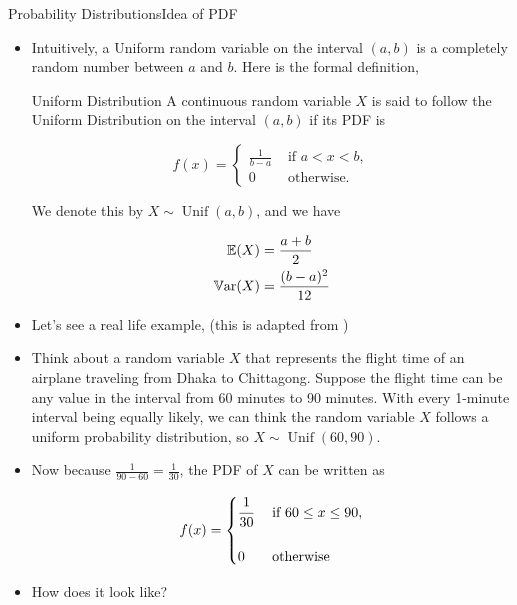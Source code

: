 \documentclass[8pt, usepdftitle = false]{beamer}
\begin{document}
\begin{frame}[allowframebreaks]{Probability Distributions}{Idea of PDF}
\begin{itemize}
\framebreak

\item Intuitively, a Uniform random variable on the interval $(a, b)$ is a completely random number between $a$ and $b$. Here is the formal definition,

\begin{varblock}{Uniform Distribution}
A continuous random variable $X$ is said to follow the \alert{Uniform Distribution} on the interval $(a, b)$ if its PDF is

$$
f(x)= \begin{cases}\frac{1}{b-a} & \text { if } a<x<b, \\ 0 & \text { otherwise. }\end{cases}
$$

We denote this by $X \sim \operatorname{Unif}(a, b)$, and we have  

\begin{align*}
\mathbb{E}(X) &= \frac{a+b}{2} \\
\mathbb{V}\mathrm{ar}{(}X) &= \frac{(b-a)^2}{12}
\end{align*}

	
\end{varblock}


\item Let's see a real life example, (this is adapted from \citet{anderson_statistics_2020})

\framebreak

\item Think about a random variable $X$ that represents the flight time of an airplane traveling from Dhaka to Chittagong. Suppose the flight time can be any value in the interval from 60 minutes to 90 minutes. With every 1-minute interval being equally likely, we can think the random variable $X$ follows a uniform probability distribution, so $X \sim \operatorname{Unif}(60, 90)$.

\item Now because $\frac{1}{90 - 60} =  \frac{1}{30}$, the PDF of $X$ can be written as 

\begin{align*}
	f(x) = \begin{cases}
		 \cfrac{1}{30} & \text{ if } 60 \leq x \leq 90, \\
		\\
		0 & \text{ otherwise}
	\end{cases}
\end{align*}

\item  How does it look like?


\end{itemize}
\end{frame}
\end{document}
